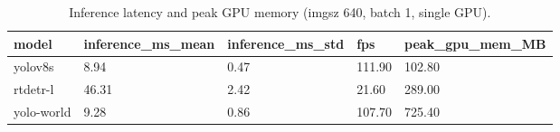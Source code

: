 \begin{table}[t]
\centering
\caption{Inference latency and peak GPU memory (imgsz 640, batch 1, single GPU).}\label{tab:latency}
\begin{tabular}{lllll}
\toprule
\textbf{model} & \textbf{inference\_ms\_mean} & \textbf{inference\_ms\_std} & \textbf{fps} & \textbf{peak\_gpu\_mem\_MB} \\
\midrule
yolov8s & 8.94 & 0.47 & 111.90 & 102.80 \\
rtdetr-l & 46.31 & 2.42 & 21.60 & 289.00 \\
yolo-world & 9.28 & 0.86 & 107.70 & 725.40 \\
\bottomrule
\end{tabular}
\end{table}
